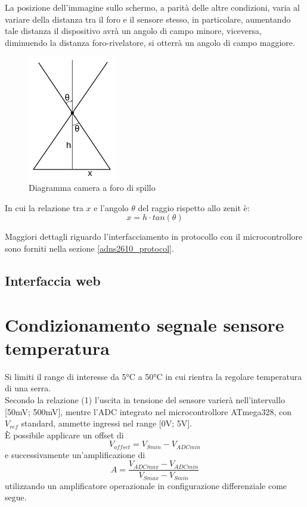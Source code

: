 \documentclass[12pt]{article}
\begin{document}
    \noindent
    La posizione dell'immagine sullo schermo, a parità delle altre condizioni, varia al variare della distanza tra il foro e il sensore stesso, in particolare, aumentando tale distanza il dispositivo avrà un angolo di campo minore, viceversa, diminuendo la distanza foro-rivelatore, si otterrà un angolo di campo maggiore.
    
    \begin{figure}[h]
        \centering
        \includegraphics[width=110pt]{Draws/Pinhole_diagram}
        \caption{Diagramma camera a foro di spillo}
        \label{fig:pinhole_diagram}
    \end{figure}
    
    \noindent
    In cui la relazione tra $x$ e l'angolo $\theta$ del raggio rispetto allo zenit è:
    \begin{equation}\label{pinhole_angle_relation}
        x = h \cdot tan(\theta)
    \end{equation}
    
    \noindent
    Maggiori dettagli riguardo l'interfacciamento in protocollo con il microcontrollore sono forniti nella sezione \ref{adns2610_protocol}.
    
    \subsection{Interfaccia web}
    
    


\vspace{1cm}

\section{Condizionamento segnale sensore temperatura}\label{conditioning}
    Si limiti il range di interesse da 5°C a 50°C in cui rientra la regolare temperatura di una serra.\\
    Secondo la relazione (1) l'uscita in tensione del sensore varierà nell'intervallo [50mV; 500mV], mentre l'ADC integrato nel microcontrollore ATmega328, con $V_{ref}$ standard, ammette ingressi nel range [0V; 5V].\\
        È possibile applicare un offset di 
        \begin{equation}
            {V_{offset}} = V_{Smin} - V_{ADCmin}
        \end{equation}
        e successivamente un'amplificazione di
        \begin{equation}
            A = \frac{V_{ADCmax}-V_{ADCmin}}{V_{Smax} - V_{Smin}}
        \end{equation}
        utilizzando un amplificatore operazionale in configurazione differenziale come segue.
\end{document}
